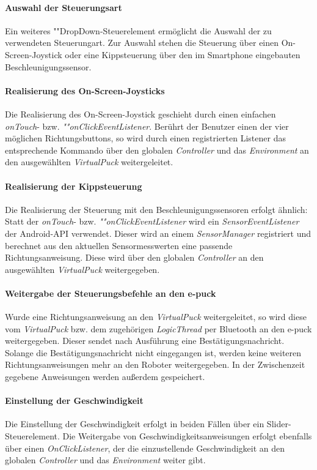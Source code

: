 \documentclass[10pt,a4paper]{article}
\begin{document}
	\paragraph*{Auswahl der Steuerungsart} Ein weiteres ""Drop\-Down-Steu\-er\-ele\-ment ermöglicht die Auswahl der zu verwendeten Steuerungart. Zur
	Auswahl stehen die Steuerung über einen On-Screen-Joystick oder eine Kippsteuerung über den im Smartphone eingebauten Beschleunigungssensor.
	
	\paragraph*{Realisierung des On-Screen-Joysticks} Die Realisierung des On-Screen-Joystick geschieht durch einen einfachen \textit{onTouch}- bzw.
	\textit{""on\-Click\-E\-vent\-List\-e\-ner}. Berührt der Benutzer einen der vier möglichen Richtungsbuttons, so wird durch einen registrierten
	Listener das entsprechende Kommando über den globalen \textit{Controller} und das \textit{Environment} an den ausgewählten \textit{VirtualPuck}
	weitergeleitet.
	
	\paragraph*{Realisierung der Kippsteuerung} Die Realisierung der Steuerung mit den Beschleunigungssensoren erfolgt ähnlich: Statt der 
	\textit{onTouch}- bzw. \textit{""on\-Click\-E\-vent\-List\-e\-ner} wird ein \textit{SensorEventListener} der Android-API verwendet. Dieser wird
	an einem \textit{SensorManager} registriert und berechnet aus den aktuellen Sensormesswerten eine passende Richtungsanweisung. Diese wird über
	den globalen \textit{Controller} an den ausgewählten \textit{VirtualPuck} weitergegeben.
	
	\paragraph*{Weitergabe der Steuerungsbefehle an den e-puck} Wurde eine Richtungsanweisung an den \textit{VirtualPuck} weitergeleitet, so wird diese vom
	\textit{VirtualPuck} bzw. dem zugehörigen \textit{LogicThread} per Bluetooth an den e-puck weitergegeben. Dieser sendet nach Ausführung eine
	Bestätigungsnachricht.
	Solange die Bestätigungsnachricht nicht eingegangen ist, werden keine weiteren Richtungsanweisungen mehr an den Roboter weitergegeben. In der 
	Zwischenzeit gegebene Anweisungen werden außerdem gespeichert.
	
	\paragraph*{Einstellung der Geschwindigkeit} Die Einstellung der Geschwindigkeit erfolgt in beiden Fällen über ein Slider-Steuerelement. Die
	Weitergabe von Geschwindigkeitsanweisungen erfolgt ebenfalls über einen \textit{OnClickListener}, der die einzustellende Geschwindigkeit an den
	globalen \textit{Controller} und das \textit{Environment} weiter gibt.
	
\end{document}
